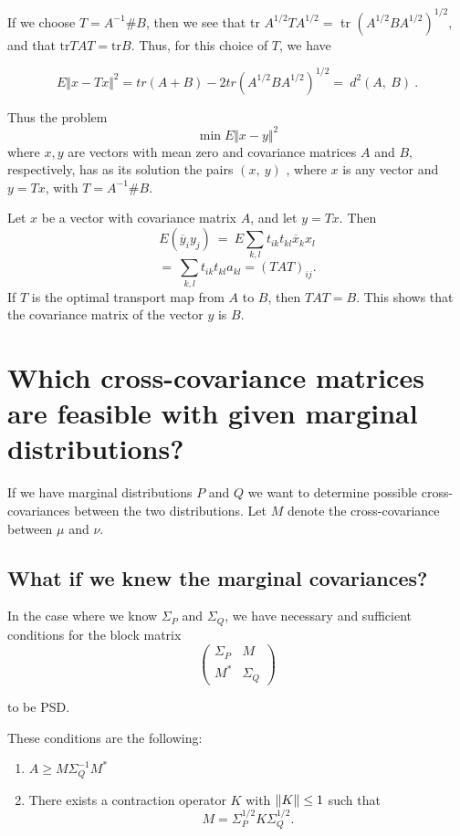 If we choose $T=A^{-1}\# B$, then  we see that tr $A^{1/2}TA^{1/2}=$ tr $(A^{1/2}BA^{1/2})^{1/2}$, and that $\mathrm{tr}TAT=\mathrm{tr}B$. Thus, for this choice of $T$, we have
\begin{center}
	$$E\Vert x-Tx\Vert^{2} = tr(A+B)-2 tr (A^{1/2}BA^{1/2})^{1/2}
	=\ d^{2}(A,\ B)\ .
	$$
\end{center}
Thus the problem
$$
\min E\Vert x-y\Vert^{2}
$$
where $x, y$ are vectors with mean zero and covariance matrices $A$ and $B,$ respectively, has as its solution the pairs $(x,\ y)$ , where $x$ is any vector and $y=Tx$, with $T=A^{-1}\# B$.

Let $x$ be a vector with covariance matrix $A$, and let $y=Tx$. Then
$$
E(\overline{y}_{i}y_{j})\ =\ E\sum_{k,l}t_{ik}t_{kl}\overline{x}_{k}x_{l}
$$
$$
=\ \sum_{k,l}t_{ik}t_{kl}a_{kl}=(TAT)_{ij}.
$$
If $T$ is the optimal transport map from $A$ to $B$, then $TAT=B$. This shows that the covariance matrix of the vector $y$ is $B.$

\section*{Which cross-covariance matrices are feasible with given marginal distributions?}

If we have marginal distributions $P$ and $Q$ we want to determine possible cross-covariances between the two distributions. Let $M$ denote the cross-covariance between $\mu$ and $\nu$.

\subsection*{What if we knew the marginal covariances?}
In the case where we know $\Sigma_{P}$ and $\Sigma_{Q}$, we have necessary and sufficient conditions for the block matrix
$$
\left( \begin{matrix}
	\Sigma_{P} & M \\
	M^{*} & \Sigma_{Q}
\end{matrix}\right) 
$$

to be PSD. 

These conditions are the following:
\begin{enumerate}
	\item $A\geq M\Sigma_{Q}^{-1}M^{*}$
	\item There exists a contraction operator $K$ with $\lVert K\rVert\leq 1$ such that $$M=\Sigma_{P}^{1/2}K\Sigma_{Q}^{1/2}.$$
\end{enumerate}

